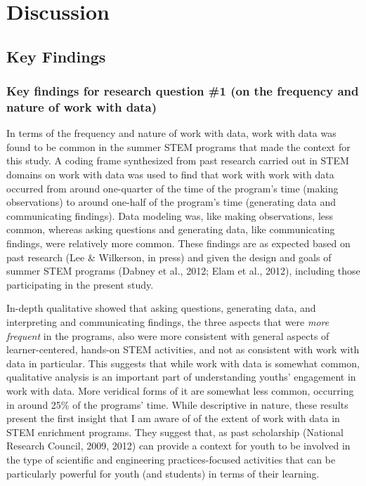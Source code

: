 \documentclass[]{book}
\theoremstyle{definition}
\theoremstyle{definition}
\theoremstyle{definition}
\theoremstyle{remark}
\begin{document}
\chapter{Discussion}\label{discussion}

\section{Key Findings}\label{key-findings}

\subsection{Key findings for research question \#1 (on the frequency and
nature of work with
data)}\label{key-findings-for-research-question-1-on-the-frequency-and-nature-of-work-with-data}

In terms of the frequency and nature of work with data, work with data
was found to be common in the summer STEM programs that made the context
for this study. A coding frame synthesized from past research carried
out in STEM domains on work with data was used to find that work with
work with data occurred from around one-quarter of the time of the
program's time (making observations) to around one-half of the program's
time (generating data and communicating findings). Data modeling was,
like making observations, less common, whereas asking questions and
generating data, like communicating findings, were relatively more
common. These findings are as expected based on past research (Lee \&
Wilkerson, in press) and given the design and goals of summer STEM
programs (Dabney et al., 2012; Elam et al., 2012), including those
participating in the present study.

In-depth qualitative showed that asking questions, generating data, and
interpreting and communicating findings, the three aspects that were
\emph{more frequent} in the programs, also were more consistent with
general aspects of learner-centered, hands-on STEM activities, and not
as consistent with work with data in particular. This suggests that
while work with data is somewhat common, qualitative analysis is an
important part of understanding youths' engagement in work with data.
More veridical forms of it are somewhat less common, occurring in around
25\% of the programs' time. While descriptive in nature, these results
present the first insight that I am aware of of the extent of work with
data in STEM enrichment programs. They suggest that, as past scholarship
(National Research Council, 2009, 2012) can provide a context for youth
to be involved in the type of scientific and engineering
practices-focused activities that can be particularly powerful for youth
(and students) in terms of their learning.
\end{document}
